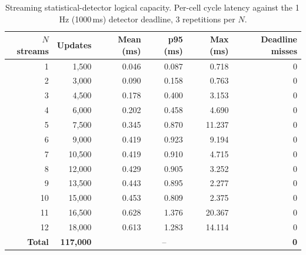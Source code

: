 \begin{table}[t]
\centering
\caption{Streaming statistical-detector logical capacity. Per-cell cycle latency against the 1\,Hz (1000\,ms) detector deadline, 3 repetitions per $N$.}
\label{tab:scal-detector}
\begin{tabular}{rrrrrr}
\toprule
$N$ streams & Updates & Mean (ms) & p95 (ms) & Max (ms) & Deadline misses \\
\midrule
1 & 1,500 & 0.046 & 0.087 & 0.718 & 0 \\
2 & 3,000 & 0.090 & 0.158 & 0.763 & 0 \\
3 & 4,500 & 0.178 & 0.400 & 3.153 & 0 \\
4 & 6,000 & 0.202 & 0.458 & 4.690 & 0 \\
5 & 7,500 & 0.345 & 0.870 & 11.237 & 0 \\
6 & 9,000 & 0.419 & 0.923 & 9.194 & 0 \\
7 & 10,500 & 0.419 & 0.910 & 4.715 & 0 \\
8 & 12,000 & 0.429 & 0.905 & 3.252 & 0 \\
9 & 13,500 & 0.443 & 0.895 & 2.277 & 0 \\
10 & 15,000 & 0.453 & 0.809 & 2.375 & 0 \\
11 & 16,500 & 0.628 & 1.376 & 20.367 & 0 \\
12 & 18,000 & 0.613 & 1.283 & 14.114 & 0 \\
\midrule
\textbf{Total} & \textbf{117,000} & \multicolumn{3}{c}{--} & \textbf{0} \\
\bottomrule
\end{tabular}
\end{table}
